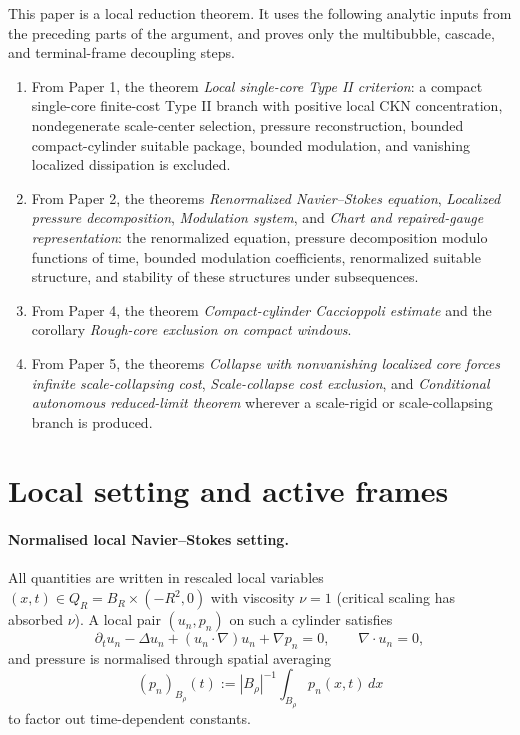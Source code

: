 \documentclass[11pt]{amsart}
\theoremstyle{plain}
\theoremstyle{definition}
\theoremstyle{remark}
\begin{document}
This paper is a local reduction theorem.  It uses the following analytic inputs
from the preceding parts of the argument, and proves only the multibubble,
cascade, and terminal-frame decoupling steps.
\begin{enumerate}[label=\textup{(\roman*)}]
\item From Paper 1, the theorem \emph{Local single-core Type II criterion}: a
compact single-core finite-cost Type II branch with positive local CKN
concentration, nondegenerate scale-center selection, pressure reconstruction,
bounded compact-cylinder suitable package, bounded modulation, and vanishing
localized dissipation is excluded.
\item From Paper 2, the theorems \emph{Renormalized Navier--Stokes equation},
\emph{Localized pressure decomposition}, \emph{Modulation system}, and
\emph{Chart and repaired-gauge representation}: the renormalized equation,
pressure decomposition modulo functions of time, bounded modulation
coefficients, renormalized suitable structure, and stability of these structures
under subsequences.
\item From Paper 4, the theorem \emph{Compact-cylinder Caccioppoli estimate}
and the corollary \emph{Rough-core exclusion on compact windows}.
\item From Paper 5, the theorems \emph{Collapse with nonvanishing localized
core forces infinite scale-collapsing cost}, \emph{Scale-collapse cost
exclusion}, and \emph{Conditional autonomous reduced-limit theorem} wherever a
scale-rigid or scale-collapsing branch is produced.
\end{enumerate}

\section{Local setting and active frames}

\paragraph{Normalised local Navier--Stokes setting.}
All quantities are written in rescaled local variables \((x,t)\in Q_R=B_R\times(-R^2,0)\)
with viscosity \(\nu=1\) (critical scaling has absorbed \(\nu\)).  A local pair
\((u_n,p_n)\) on such a cylinder satisfies
\[
  \partial_tu_n-\Delta u_n+(u_n\cdot\nabla)u_n+\nabla p_n=0,\qquad \nabla\cdot u_n=0,
\]
and pressure is normalised through spatial averaging
\[
  (p_n)_{B_\rho}(t):=|B_\rho|^{-1}\int_{B_\rho}p_n(x,t)\,dx
\]
to factor out time-dependent constants.
\end{document}
